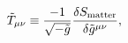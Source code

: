 \begin{equation}\label{stress_definition}
{\tilde{T}}_{\mu\nu}\equiv{\frac{-1}{\sqrt{-{\tilde{g}}}}}
{\frac{\delta S_{{\rm{matter}}}}{\delta {\tilde{g}}^{\mu\nu}}},
\end{equation}

